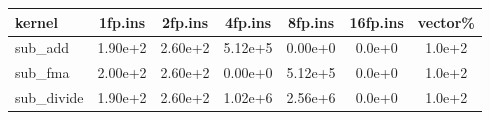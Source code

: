 %
\begin{tabular}{l|c|c|c|c|c|c}
\\ \hline
kernel  	& 1fp.ins  & 2fp.ins  & 4fp.ins  & 8fp.ins  & 16fp.ins  & vector\%
\\ \hline
sub\_add  	& 1.90e+2  & 2.60e+2  & 5.12e+5  & 0.00e+0  & 0.0e+0  & 1.0e+2
\\
sub\_fma  	& 2.00e+2  & 2.60e+2  & 0.00e+0  & 5.12e+5  & 0.0e+0  & 1.0e+2
\\
sub\_divide	& 1.90e+2  & 2.60e+2  & 1.02e+6  & 2.56e+6  & 0.0e+0  & 1.0e+2
\\ \hline
\end{tabular}
%
